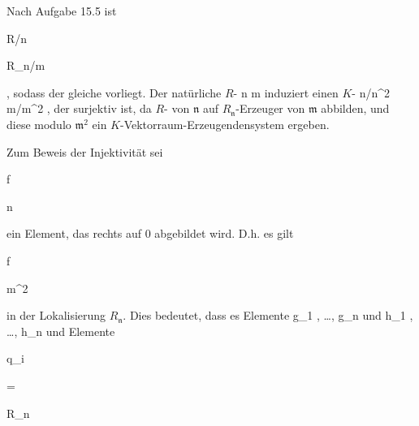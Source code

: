 {


Nach
Aufgabe 15.5
ist


\mavergleichskette

{\vergleichskette

{ R/{\mathfrak n}
}

{ \cong }{ R_{\mathfrak n}/{\mathfrak m}
}

{  }{
}

{    }{
}

{   }{
}

}
{}{}{,}
sodass der gleiche
vorliegt. Der natürliche
$R$-
\maabb {} { {\mathfrak n} } { {\mathfrak m}
} {}
induziert einen
$K$-
\maabbdisp {} { {\mathfrak n}/{\mathfrak n}^2 } { {\mathfrak m}/{\mathfrak m}^2
} {,}
der surjektiv ist, da
$R$-
von ${\mathfrak n}$ auf $R_{\mathfrak n}$-Erzeuger von ${\mathfrak m}$ abbilden, und diese modulo ${\mathfrak m}^2$ ein $K$-Vektorraum-Erzeugendensystem ergeben.


Zum Beweis der Injektivität sei


\mavergleichskette

{\vergleichskette

{ f
}

{ \in }{ {\mathfrak n}
}

{  }{
}

{    }{
}

{   }{
}

}
{}{}{}
ein Element, das rechts auf $0$ abgebildet wird. D.h. es gilt


\mavergleichskette

{\vergleichskette

{ f
}

{ \in }{ {\mathfrak m}^2
}

{  }{
}

{    }{
}

{   }{
}

}
{}{}{}
in der Lokalisierung $R_{\mathfrak n}$. Dies bedeutet, dass es Elemente
\mathkor {} {g_1 , \ldots ,  g_n } {und} {h_1 , \ldots , h_n } {}
und Elemente


\mavergleichskette

{\vergleichskette

{ q_i
}

{ = }{ {  }
}

{ \in }{ R_{\mathfrak n}
}

}}
